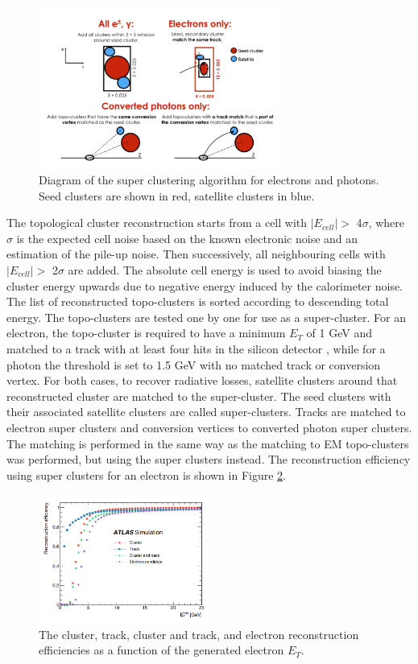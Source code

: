 \begin{figure}[htbp]
    \centering
    \includegraphics[width=0.7\textwidth]{Ch2/Img/Super_cluster.png}
    \caption{Diagram of the super clustering algorithm for electrons and photons. Seed clusters are shown in red, satellite clusters in blue.}
    \label{fig:chap2:Objetcs:Egamma:SC}
\end{figure}
The topological cluster reconstruction starts from a cell with $|E_{cell}|>$ 4$\sigma$, where $\sigma$ is the expected cell noise based on the known electronic noise and an estimation of the pile-up noise. Then successively, all neighbouring cells with $|E_{cell}|>$ 2$\sigma$ are added. The absolute cell energy is used to avoid biasing the cluster energy upwards due to negative energy induced by the calorimeter noise. The list of reconstructed topo-clusters is sorted according to descending total energy. The topo-clusters are tested one by one for use as a super-cluster. For an electron, the topo-cluster is required to have a minimum $E_T$ of 1 GeV and matched to a track with at least four hits in the silicon detector \cite{GSF}, while for a photon the threshold is set to 1.5 GeV with no matched track or conversion vertex. For both cases, to recover radiative losses, satellite clusters around that reconstructed cluster are matched to the super-cluster. The seed clusters with their associated satellite clusters are called super-clusters. Tracks are matched to electron super clusters and conversion vertices to converted photon super clusters. The matching is performed in the same way as the matching to EM topo-clusters was performed, but using the super clusters instead. The reconstruction efficiency using super clusters for an electron is shown in Figure \ref{fig:chap2:Objects:Egamma:El_Eff}.
\begin{figure}[htbp]
    \centering
    \includegraphics[width=0.5\textwidth]{Ch2/Img/Electron_Reco_Eff.png}
    \caption{The cluster, track, cluster and track, and electron reconstruction efficiencies as a function of the generated electron $E_T$.}
    \label{fig:chap2:Objects:Egamma:El_Eff}
\end{figure}

